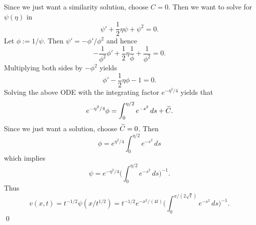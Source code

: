 Since we just want a similarity solution, choose $C = 0$.
Then we want to solve for $\psi(\eta)$ in
$$\psi' + \frac{1}{2}\eta\psi + \psi^{2} = 0.$$
Let $\phi := 1/\psi$. Then $\psi' = -\phi'/\phi^{2}$ and hence
$$-\frac{1}{\phi^{2}}\phi' + \frac{1}{2}\eta \frac{1}{\phi} + \frac{1}{\phi^{2}} = 0.$$
Multiplying both sides by $-\phi^{2}$ yields
$$\phi' - \frac{1}{2}\eta\phi - 1 = 0.$$
Solving the above ODE with the integrating factor $e^{-\eta^{2}/4}$ yields that
$$e^{-\eta^{2}/4}\phi = \int_{0}^{\eta/2}e^{-s^{2}}\, ds + \widetilde{C}.$$
Since we just want a solution, choose $\widetilde{C} = 0$. Then
$$\phi = e^{\eta^{2}/4}\int_{0}^{\eta/2}e^{-s^{2}}\, ds$$
which implies
$$\psi = e^{-\eta^{2}/4}\bigg(\int_{0}^{\eta/2}e^{-s^{2}}\, ds\bigg)^{-1}.$$
Thus
$$v(x, t) = t^{-1/2}\psi(x/t^{1/2}) = t^{-1/2}e^{-x^{2}/(4t)}\bigg(\int_{0}^{x/(2\sqrt{t})}e^{-s^{2}}\, ds\bigg)^{-1}.$$
\hfill\qed
